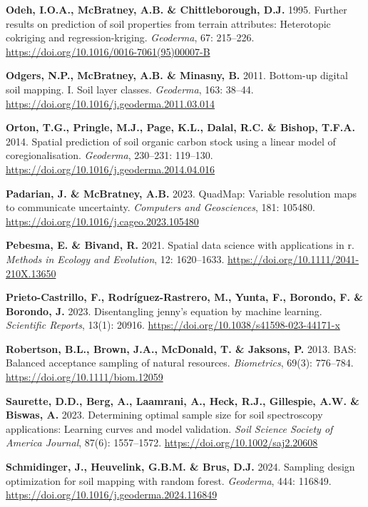 \documentclass[
  10pt,
  b5paper,
  oneside]{book}
\newlength{\cslhangindent}
\newenvironment{CSLReferences}[2] %
 {\begin{list}{}{%
  \setlength{\itemindent}{0pt}
  \setlength{\leftmargin}{0pt}
  \setlength{\parsep}{0pt}
  \ifodd #1
   \setlength{\leftmargin}{\cslhangindent}
   \setlength{\itemindent}{-1\cslhangindent}
  \fi
  \setlength{\itemsep}{#2\baselineskip}}}
 {\end{list}}
\begin{document}
\begin{CSLReferences}{0}{0}
\textbf{Odeh, I.O.A., McBratney, A.B. \& Chittleborough, D.J.} 1995. Further results on prediction of soil properties from terrain attributes: Heterotopic cokriging and regression-kriging. \emph{Geoderma}, 67: 215--226. \url{https://doi.org/10.1016/0016-7061(95)00007-B}

\textbf{Odgers, N.P., McBratney, A.B. \& Minasny, B.} 2011. Bottom-up digital soil mapping. {I}. {S}oil layer classes. \emph{Geoderma}, 163: 38--44. \url{https://doi.org/10.1016/j.geoderma.2011.03.014}

\textbf{Orton, T.G., Pringle, M.J., Page, K.L., Dalal, R.C. \& Bishop, T.F.A.} 2014. Spatial prediction of soil organic carbon stock using a linear model of coregionalisation. \emph{Geoderma}, 230--231: 119--130. \url{https://doi.org/10.1016/j.geoderma.2014.04.016}

\textbf{Padarian, J. \& McBratney, A.B.} 2023. {QuadMap}: Variable resolution maps to communicate uncertainty. \emph{Computers and Geosciences}, 181: 105480. \url{https://doi.org/10.1016/j.cageo.2023.105480}

\textbf{Pebesma, E. \& Bivand, R.} 2021. Spatial data science with applications in r. \emph{Methods in Ecology and Evolution}, 12: 1620--1633. \url{https://doi.org/10.1111/2041-210X.13650}

\textbf{Prieto-Castrillo, F., Rodríguez-Rastrero, M., Yunta, F., Borondo, F. \& Borondo, J.} 2023. Disentangling jenny's equation by machine learning. \emph{Scientific Reports}, 13(1): 20916. \url{https://doi.org/10.1038/s41598-023-44171-x}

\textbf{Robertson, B.L., Brown, J.A., McDonald, T. \& Jaksons, P.} 2013. {BAS}: Balanced acceptance sampling of natural resources. \emph{Biometrics}, 69(3): 776--784. \url{https://doi.org/10.1111/biom.12059}

\textbf{Saurette, D.D., Berg, A., Laamrani, A., Heck, R.J., Gillespie, A.W. \& Biswas, A.} 2023. Determining optimal sample size for soil spectroscopy applications: Learning curves and model validation. \emph{Soil Science Society of America Journal}, 87(6): 1557--1572. \url{https://doi.org/10.1002/saj2.20608}

\textbf{Schmidinger, J., Heuvelink, G.B.M. \& Brus, D.J.} 2024. Sampling design optimization for soil mapping with random forest. \emph{Geoderma}, 444: 116849. \url{https://doi.org/10.1016/j.geoderma.2024.116849}


\end{CSLReferences}
\end{document}

